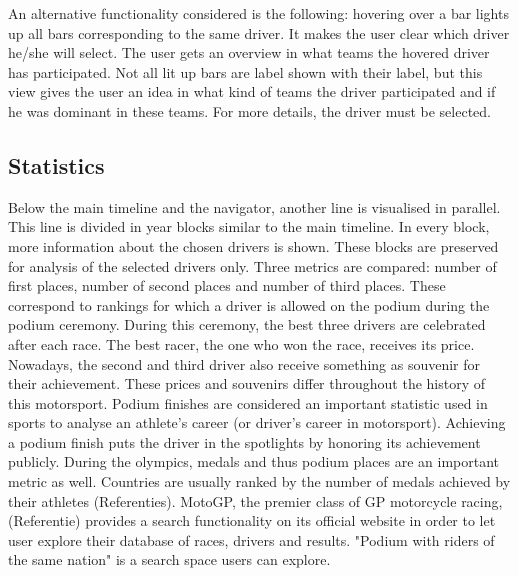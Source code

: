 \documentclass{sigchi}
\begin{document}
An alternative functionality considered is the following: hovering over a bar lights up all bars corresponding to the same driver. It makes the user clear which driver he/she will select. The user gets an overview in what teams the hovered driver has participated. Not all lit up bars are label shown with their label, but this view gives the user an idea in what kind of teams the driver participated and if he was dominant in these teams. For more details, the driver must be selected.

\subsection{Statistics}

Below the main timeline and the navigator, another line is visualised in parallel. This line is divided in year blocks similar to the main timeline. In every block, more information about the chosen drivers is shown. These blocks are preserved for analysis of the selected drivers only. Three metrics are compared: number of first places, number of second places and number of third places. These correspond to rankings for which a driver is allowed on the podium during the podium ceremony. During this ceremony, the best three drivers are celebrated after each race. The best racer, the one who won the race, receives its price. Nowadays, the second and third driver also receive something as souvenir for their achievement. These prices and souvenirs differ throughout the history of this motorsport.  Podium finishes are considered an important statistic used in sports to analyse an athlete's career (or driver's career in motorsport). Achieving a podium finish puts the driver in the spotlights by honoring its achievement publicly. During the olympics, medals and thus podium places are an important metric as well. Countries are usually ranked by the number of medals achieved by their athletes (Referenties). MotoGP, the premier class of GP motorcycle racing, (Referentie) provides a search functionality on its official website in order to let user explore their database of races, drivers and results. "Podium with riders of the same nation" is a search space users can explore.
\end{document}
